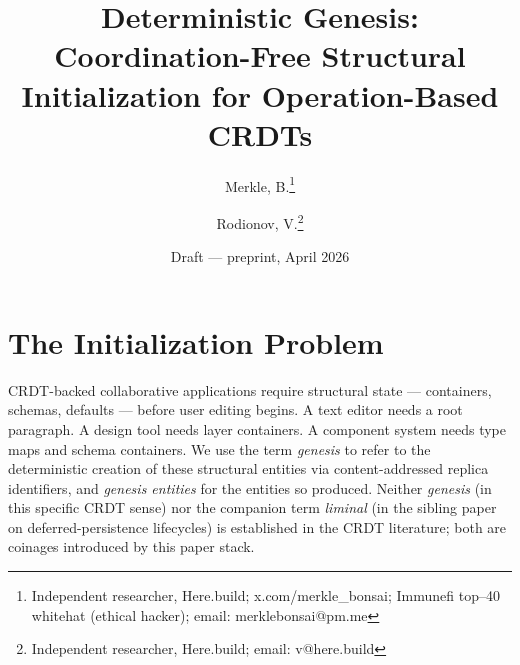 

\title{Deterministic Genesis: Coordination-Free Structural Initialization for Operation-Based CRDTs}
\author{%
    Merkle, B.\thanks{Independent researcher, Here.build; x.com/merkle\_bonsai; Immunefi top--40 whitehat (ethical hacker); email: merklebonsai@pm.me}%
    \and%
    Rodionov, V.\thanks{Independent researcher, Here.build; email: v@here.build}%
}
\date{Draft --- preprint, April 2026}





\maketitle

\section{The Initialization Problem}

CRDT-backed collaborative applications require structural state --- containers, schemas, defaults --- before user editing begins. A text editor needs a root paragraph. A design tool needs layer containers. A component system needs type maps and schema containers. We use the term \emph{genesis} to refer to the deterministic creation of these structural entities via content-addressed replica identifiers, and \emph{genesis entities} for the entities so produced. Neither \emph{genesis} (in this specific CRDT sense) nor the companion term \emph{liminal} (in the sibling paper on deferred-persistence lifecycles) is established in the CRDT literature; both are coinages introduced by this paper stack.

